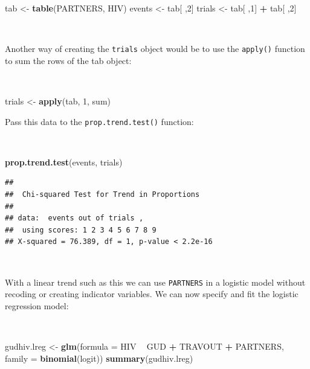 \documentclass[12pt,a4paper]{book}
\newenvironment{Shaded}{\begin{snugshade}}{\end{snugshade}}
\newcommand{\KeywordTok}[1]{\textcolor[rgb]{0.13,0.29,0.53}{\textbf{#1}}}
\newcommand{\DataTypeTok}[1]{\textcolor[rgb]{0.13,0.29,0.53}{#1}}
\newcommand{\DecValTok}[1]{\textcolor[rgb]{0.00,0.00,0.81}{#1}}
\newcommand{\StringTok}[1]{\textcolor[rgb]{0.31,0.60,0.02}{#1}}
\newcommand{\OperatorTok}[1]{\textcolor[rgb]{0.81,0.36,0.00}{\textbf{#1}}}
\newcommand{\NormalTok}[1]{#1}
\theoremstyle{definition}
\theoremstyle{definition}
\theoremstyle{definition}
\theoremstyle{remark}
\begin{document}
\begin{Shaded}
\begin{Highlighting}[]
\NormalTok{tab <-}\StringTok{ }\KeywordTok{table}\NormalTok{(PARTNERS, HIV)}
\NormalTok{events <-}\StringTok{ }\NormalTok{tab[ ,}\DecValTok{2}\NormalTok{]}
\NormalTok{trials <-}\StringTok{ }\NormalTok{tab[ ,}\DecValTok{1}\NormalTok{] }\OperatorTok{+}\StringTok{ }\NormalTok{tab[ ,}\DecValTok{2}\NormalTok{]}
\end{Highlighting}
\end{Shaded}

~

Another way of creating the \texttt{trials} object would be to use the
\texttt{apply()} function to sum the rows of the tab object:

~

\begin{Shaded}
\begin{Highlighting}[]
\NormalTok{trials <-}\StringTok{ }\KeywordTok{apply}\NormalTok{(tab, }\DecValTok{1}\NormalTok{, sum)}
\end{Highlighting}
\end{Shaded}

\newpage

Pass this data to the \texttt{prop.trend.test()} function:

~

\begin{Shaded}
\begin{Highlighting}[]
\KeywordTok{prop.trend.test}\NormalTok{(events, trials)}
\end{Highlighting}
\end{Shaded}

\begin{verbatim}
## 
##  Chi-squared Test for Trend in Proportions
## 
## data:  events out of trials ,
##  using scores: 1 2 3 4 5 6 7 8 9
## X-squared = 76.389, df = 1, p-value < 2.2e-16
\end{verbatim}

~

With a linear trend such as this we can use \texttt{PARTNERS} in a
logistic model without recoding or creating indicator variables. We can
now specify and fit the logistic regression model:

~

\begin{Shaded}
\begin{Highlighting}[]
\NormalTok{gudhiv.lreg <-}\StringTok{ }\KeywordTok{glm}\NormalTok{(}\DataTypeTok{formula =}\NormalTok{ HIV }\OperatorTok{~}\StringTok{ }\NormalTok{GUD }\OperatorTok{+}\StringTok{ }\NormalTok{TRAVOUT }\OperatorTok{+}\StringTok{ }\NormalTok{PARTNERS,}
                   \DataTypeTok{family =} \KeywordTok{binomial}\NormalTok{(logit))}
\KeywordTok{summary}\NormalTok{(gudhiv.lreg)}
\end{Highlighting}
\end{Shaded}
\end{document}
